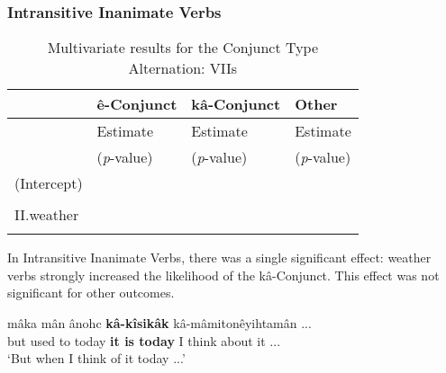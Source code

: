     \subsubsection{Intransitive Inanimate Verbs}
                \begin{table}[H]
                \centering
                \begin{tabular}{llll}
                \toprule
                            & \textbf{ê-Conjunct}   & \textbf{kâ-Conjunct}  & \textbf{Other} \\
                                            \midrule
                            & Estimate     & Estimate     & Estimate\\
                            & (\textit{p}-value) & (\textit{p}-value) & (\textit{p}-value) \\
                \midrule
                
(Intercept)    & \cellcolor[HTML]{B6D7A8}{1.468} & \cellcolor[HTML]{EA9999}{-2.554} & \cellcolor[HTML]{EA9999}{-2.452} \\
               & \cellcolor[HTML]{B6D7A8}{(0.004)} & \cellcolor[HTML]{EA9999}{($<$ 0.001)}      & \cellcolor[HTML]{EA9999}{($<$ 0.001)}      \\
II.weather &       & \cellcolor[HTML]{B6D7A8}{1.596}  &        \\
               &       & \cellcolor[HTML]{B6D7A8}{(0.017)}  &        \\ 


    
                \bottomrule
                \end{tabular}
                \caption{
                   Multivariate results for the Conjunct Type Alternation: VIIs \\ \label{tab:iiecnjall}
                  }
                \end{table}
                
    In Intransitive Inanimate Verbs, there was a single significant effect: weather verbs strongly increased the likelihood of the kâ-Conjunct. This effect was not significant for other outcomes. 
    
        \begin{exe}
        \ex
        \gll   mâka mân      ânohc \textbf{kâ-kîsikâk}    kâ-mâmitonêyihtamân ...\\
               but {used to} today {\textbf{it is today}} {I think about it} ...\\
        \trans `But when I think of it today ...' \citep[218]{Bearetal1992}
        \label{ivcii1}
        \end{exe}
        
